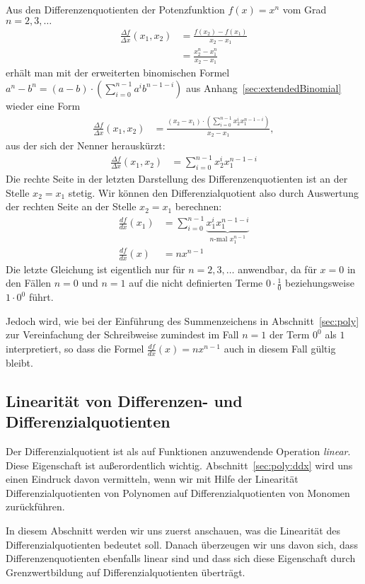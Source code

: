 \documentclass{article}
\let\l\left\let\r\right\let\cs\csname\let\ecs\endcsname\let\ea\expandafter
\def\ddx#1{\frac{d#1}{dx}}
\def\DDx#1{\frac{\Delta#1}{\Delta x}}
\begin{document}
Aus den Differenzenquotienten der Potenzfunktion $f(x)=x^n$ vom Grad $n=2,3,\ldots$
\begin{align*}
  \frac{\Delta f}{\Delta x}(x_1,x_2) &= \frac{f(x_2) - f(x_1)}{x_2-x_1}\\
                                     &= \frac{x_2^n - x_1^n}{x_2-x_1}
\end{align*}
erhält man mit der erweiterten binomischen Formel
$a^n-b^n=(a-b)\cdot\l(\sum_{i=0}^{n-1}a^ib^{n-1-i}\r)$ aus
Anhang~\ref{sec:extendedBinomial} wieder eine Form
\begin{align*}
  \DDx f(x_1,x_2)&= \frac{(x_2-x_1)\cdot\l(\sum_{i=0}^{n-1} x_2^ix_1^{n-1-i}\r)}{x_2-x_1},
\end{align*}
aus der sich der Nenner herauskürzt:
\begin{align*}
  \DDx f(x_1,x_2)&= \sum_{i=0}^{n-1} x_2^ix_1^{n-1-i}
\end{align*}
Die rechte Seite in der letzten Darstellung des Differenzenquotienten
ist an der Stelle $x_2=x_1$ stetig.  Wir können den
Differenzialquotient also durch Auswertung der rechten Seite an der
Stelle $x_2=x_1$ berechnen:
\begin{align}
  \ddx f(x_1) &= \sum_{i=0}^{n-1} \underbrace{x_1^i x_1^{n-1-i}}_{\text{$n$-mal $x_1^{n-1}$}} \\
  \ddx f(x) &= n x^{n-1}\label{eq:diff:monom}
\end{align}
Die letzte Gleichung ist eigentlich nur für $n=2,3,\ldots$ anwendbar,
da für $x=0$ in den Fällen $n=0$ und $n=1$ auf die nicht definierten
Terme $0\cdot\frac{1}{0}$ beziehungsweise $1\cdot 0^0$ führt.

Jedoch wird, wie bei der Einführung des Summenzeichens in
Abschnitt~\ref{sec:poly} zur Vereinfachung der Schreibweise zumindest
im Fall $n=1$ der Term $0^0$ als $1$ interpretiert, so dass die Formel
$\ddx f(x) = n x^{n-1}$ auch in diesem Fall gültig bleibt.
\subsection{Linearität von Differenzen- und Differenzialquotienten}
\label{sec:linearity}
Der Differenzialquotient ist als auf Funktionen anzuwendende Operation
\emph{linear}.  Diese Eigenschaft ist außerordentlich
wichtig. Abschnitt~\ref{sec:poly:ddx} wird uns einen Eindruck davon
vermitteln, wenn wir mit Hilfe der Linearität Differenzialquotienten
von Polynomen auf Differenzialquotienten von Monomen zurückführen.

In diesem Abschnitt werden wir uns zuerst anschauen, was die
Linearität des Differenzialquotienten bedeutet soll. Danach überzeugen
wir uns davon sich, dass Differenzenquotienten ebenfalls linear sind
und dass sich diese Eigenschaft durch Grenzwertbildung auf
Differenzialquotienten überträgt.
\end{document}
